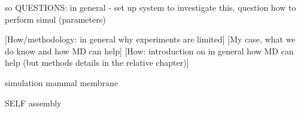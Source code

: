 so QUESTIONS:
in general - set up system to investigate this, question how to perform simul (parameters)


[How/methodology: in general why experiments are limited]
[My case, what we do know and how MD can help]
[How: introduction on in general how MD can help (but methods details in the relative chapter)]
\clearpage





simulation mammal membrane \cite{Ingolfsson2014}

SELF assembly




\clearpage





